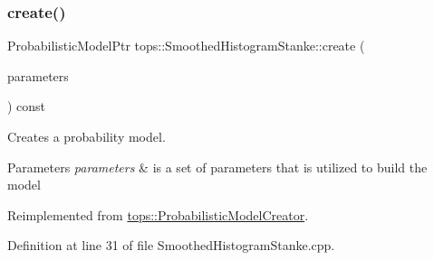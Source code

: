 \subsubsection{\texorpdfstring{create()}{create()}}
{\footnotesize\ttfamily Probabilistic\+Model\+Ptr tops\+::\+Smoothed\+Histogram\+Stanke\+::create (\begin{DoxyParamCaption}\item[{\hyperlink{classtops_1_1ProbabilisticModelParameters}{Probabilistic\+Model\+Parameters} \&}]{parameters }\end{DoxyParamCaption}) const\hspace{0.3cm}{\ttfamily [virtual]}}



Creates a probability model. 


\begin{DoxyParams}{Parameters}
{\em parameters} & is a set of parameters that is utilized to build the model \\
\hline
\end{DoxyParams}


Reimplemented from \hyperlink{classtops_1_1ProbabilisticModelCreator_afed6c8ffa45fff446bdaa8b533da8f7c}{tops\+::\+Probabilistic\+Model\+Creator}.



Definition at line 31 of file Smoothed\+Histogram\+Stanke.\+cpp.


